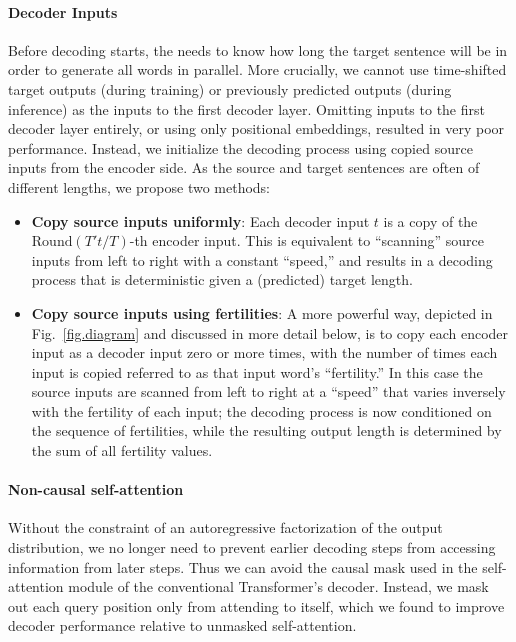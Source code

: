 \documentclass{article} \usepackage{iclr2018_conference,times}
\begin{document}
\paragraph{Decoder Inputs}
Before decoding starts, the \model{} needs to know how long the target sentence will be in order to generate all words in parallel.
More crucially, we cannot use time-shifted target outputs (during training) or previously predicted outputs (during inference) as the inputs to the first decoder layer.
Omitting inputs to the first decoder layer entirely, or using only positional embeddings, resulted in very poor performance.
Instead, we initialize the decoding process using copied source inputs from the encoder side. As the source and target sentences are often of different lengths, we propose two methods:
\begin{itemize}[leftmargin=*]
\item \textbf{Copy source inputs uniformly}: Each decoder input $t$ is a copy of the $\text{Round}(T't/T)$-th encoder input. This is equivalent to ``scanning'' source inputs from left to right with a constant ``speed,'' and results in a decoding process that is deterministic given a (predicted) target length.
\item \textbf{Copy source inputs using fertilities}: A more powerful way, depicted in Fig.~\ref{fig.diagram} and discussed in more detail below, 
is to copy each encoder input as a decoder input zero or more times, with the number of times each input is copied referred to as that input word's ``fertility.''
In this case the source inputs are scanned from left to right at a ``speed'' that varies inversely with the fertility of each input; the decoding process is now conditioned on the sequence of fertilities, while the resulting output length is determined by the sum of all fertility values. 
\end{itemize}

\vspace{-5pt}
\paragraph{Non-causal self-attention}
Without the constraint of an autoregressive factorization of the output distribution, we no longer need to prevent earlier decoding steps from accessing information from later steps. Thus we can avoid the causal mask used in the self-attention module of the conventional Transformer's decoder. Instead, we  mask out each query position only from attending to itself, which we found to improve decoder performance relative to unmasked self-attention.
\end{document}
